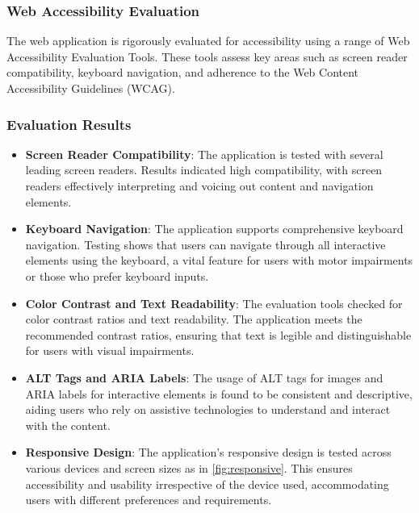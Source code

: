 \subsubsection{Web Accessibility Evaluation}
The web application is rigorously evaluated for accessibility using a range of Web Accessibility Evaluation Tools. These tools assess key areas such as screen reader compatibility, keyboard navigation, and adherence to the Web Content Accessibility Guidelines (WCAG).

\subsubsection{Evaluation Results}
\begin{itemize}
  \item \textbf{Screen Reader Compatibility}: The application is tested with several leading screen readers. Results indicated high compatibility, with screen readers effectively interpreting and voicing out content and navigation elements.
  \item \textbf{Keyboard Navigation}: The application supports comprehensive keyboard navigation. Testing shows that users can navigate through all interactive elements using the keyboard, a vital feature for users with motor impairments or those who prefer keyboard inputs.
  \item \textbf{Color Contrast and Text Readability}: The evaluation tools checked for color contrast ratios and text readability. The application meets the recommended contrast ratios, ensuring that text is legible and distinguishable for users with visual impairments.
  \item \textbf{ALT Tags and ARIA Labels}: The usage of ALT tags for images and ARIA labels for interactive elements is found to be consistent and descriptive, aiding users who rely on assistive technologies to understand and interact with the content.
  \item \textbf{Responsive Design}: The application's responsive design is tested across various devices and screen sizes as in \ref{fig:responsive}. This ensures accessibility and usability irrespective of the device used, accommodating users with different preferences and requirements.
\end{itemize}

